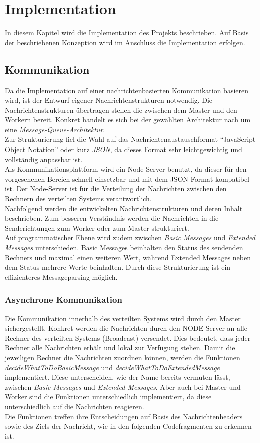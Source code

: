 \chapter{Implementation}
\label{implementation}
In diesem Kapitel wird die Implementation des Projekts beschrieben. Auf Basis der beschriebenen Konzeption wird im Anschluss die Implementation erfolgen. 
\section{Kommunikation}
Da die Implementation auf einer nachrichtenbasierten Kommunikation basieren wird, ist der Entwurf eigener Nachrichtenstrukturen notwendig. Die Nachrichtenstrukturen übertragen stellen die zwischen dem Master und den Workern bereit. Konkret handelt es sich bei der gewählten Architektur nach \citep{tanenbaum} um eine \emph{Message-Queue-Architektur}. \\
Zur Strukturierung fiel die Wahl auf das Nachrichtenaustauschformat \enquote{JavaScript Object Notation} oder kurz \emph{JSON}, da dieses Format sehr leichtgewichtig und vollständig anpassbar ist. \\
Als Kommunikationsplattform wird ein Node-Server benutzt, da dieser für den vorgesehenen Bereich schnell einsetzbar und mit dem JSON-Format kompatibel ist. Der Node-Server ist für die Verteilung der Nachrichten zwischen den Rechnern des verteilten Systems verantwortlich. \\

Nachfolgend werden die entwickelten Nachrichtenstrukturen und deren Inhalt beschrieben. Zum besseren Verständnis werden die Nachrichten in die Senderichtungen zum Worker oder zum Master strukturiert. \\
Auf programmatischer Ebene wird zudem zwischen \emph{Basic Messages} und \emph{Extended Messages} unterschieden. Basic Messages beinhalten den Status des sendenden Rechners und maximal einen weiteren Wert, während Extended Messages neben dem Status mehrere Werte beinhalten. Durch diese Strukturierung ist ein effizienteres Messageparsing möglich. 

\subsection{Asynchrone Kommunikation}
Die Kommunikation innerhalb des verteilten Systems wird durch den Master sichergestellt. Konkret werden die Nachrichten durch den NODE-Server an alle Rechner des verteilten Systems (Broadcast) versendet. Dies bedeutet, dass jeder Rechner alle Nachrichten erhält und lokal zur Verfügung stehen. Damit die jeweiligen Rechner die Nachrichten zuordnen können, werden die Funktionen \emph{decideWhatToDoBasicMessage} und \emph{decideWhatToDoExtendedMessage} implementiert. Diese unterscheiden, wie der Name bereits vermuten lässt, zwischen \emph{Basic Messages} und \emph{Extended Messages}. Aber auch bei Master und Worker sind die Funktionen unterschiedlich implementiert, da diese unterschiedlich auf die Nachrichten reagieren. \\
Die Funktionen treffen ihre Entscheidungen auf Basis des Nachrichtenheaders sowie des Ziels der Nachricht, wie in den folgenden Codefragmenten zu erkennen ist. 
\newpage

